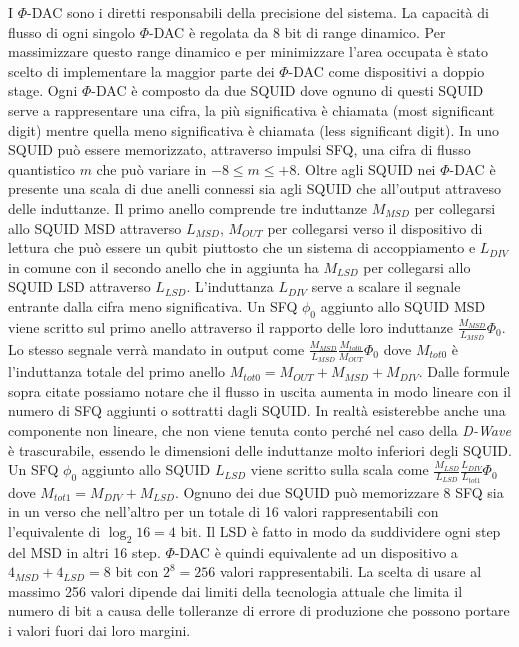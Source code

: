 \cite{ACI}I $\Phi$-DAC sono i diretti responsabili della precisione del sistema. La capacità di flusso di ogni singolo $\Phi$-DAC è regolata da 8 bit di range dinamico. Per massimizzare questo range dinamico e per minimizzare l'area occupata è stato scelto di implementare la maggior parte dei $\Phi$-DAC come dispositivi a doppio stage. Ogni $\Phi$-DAC è composto da due SQUID dove ognuno di questi SQUID serve a rappresentare una cifra, la più significativa è chiamata  (most significant digit) mentre quella meno significativa è chiamata  (less significant digit). In uno SQUID può essere memorizzato, attraverso impulsi SFQ, una cifra di flusso quantistico $m$ che può variare in $-8 \le m \le +8$. Oltre agli SQUID nei $\Phi$-DAC è presente una scala di due anelli connessi sia agli SQUID che all'output attraveso delle induttanze.
Il primo anello comprende tre induttanze $M_{MSD}$ per collegarsi allo SQUID MSD attraverso $L_{MSD}$, $M_{OUT}$ per collegarsi verso il dispositivo di lettura che può essere un qubit piuttosto che un sistema di accoppiamento e $L_{DIV}$ in comune con il secondo anello che in aggiunta ha $M_{LSD}$ per collegarsi allo SQUID LSD attraverso $L_{LSD}$. L'induttanza $L_{DIV}$ serve a scalare il segnale entrante dalla cifra meno significativa.
Un SFQ $\phi_0$ aggiunto allo SQUID MSD viene scritto sul primo anello attraverso il rapporto delle loro induttanze $\frac{M_{MSD}}{L_{MSD}}\Phi_0$.
Lo stesso segnale verrà mandato in output come $\frac{M_{MSD}}{L_{MSD}}\frac{M_{tot0}}{M_{OUT}}\Phi_0$ dove $M_{tot0}$ è l'induttanza totale del primo anello $M_{tot0} = M_{OUT} + M_{MSD} + M_{DIV}$. Dalle formule sopra citate possiamo notare che il flusso in uscita aumenta in modo lineare con il numero di SFQ aggiunti o sottratti dagli SQUID. In realtà esisterebbe anche una componente non lineare, che non viene tenuta conto perché nel caso della \textit{D-Wave} è trascurabile, essendo le dimensioni delle induttanze molto inferiori degli SQUID.
Un SFQ $\phi_0$ aggiunto allo SQUID $L_{LSD}$ viene scritto sulla scala come $\frac{M_{LSD}}{L_{LSD}}\frac{L_{DIV}}{L_{tot1}}\Phi_0$ dove $M_{tot1} = M_{DIV} + M_{LSD}$. Ognuno dei due SQUID può memorizzare 8 SFQ sia in un verso che nell'altro per un totale di 16 valori rappresentabili con l'equivalente di $\log_2{16} = 4$ bit. Il LSD è fatto in modo da suddividere ogni step del MSD in altri 16 step. $\Phi$-DAC è quindi equivalente ad un dispositivo a $4_{MSD} + 4_{LSD} = 8$ bit con $2^8 = 256$ valori rappresentabili.
La scelta di usare al massimo 256 valori dipende dai limiti della tecnologia attuale che limita il numero di bit a causa delle tolleranze di errore di produzione che possono portare i valori fuori dai loro margini.
